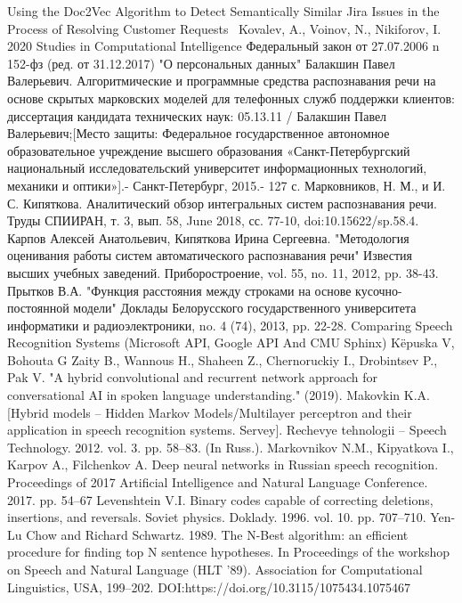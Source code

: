\documentclass[conference]{IEEEtran}
\begin{document}
\begin{thebibliography}{00}
 Using the Doc2Vec Algorithm to Detect Semantically Similar Jira Issues in the Process of Resolving Customer Requests  Kovalev, A., Voinov, N., Nikiforov, I. 2020 Studies in Computational Intelligence
 Федеральный закон от 27.07.2006 n 152-фз (ред. от 31.12.2017) "О персональных данных"
 Балакшин Павел Валерьевич. Алгоритмические и программные средства распознавания речи на основе скрытых марковских моделей для телефонных служб поддержки клиентов: диссертация кандидата технических наук: 05.13.11 / Балакшин Павел Валерьевич;[Место защиты: Федеральное государственное автономное образовательное учреждение высшего образования «Санкт-Петербургский национальный исследовательский университет информационных технологий, механики и оптики»].- Санкт-Петербург, 2015.- 127 с.
 Марковников, Н. М., и И. С. Кипяткова. Аналитический обзор интегральных систем распознавания речи. Труды СПИИРАН, т. 3, вып. 58, June 2018, сс. 77-10, doi:10.15622/sp.58.4.
 Карпов Алексей Анатольевич, Кипяткова Ирина Сергеевна. "Методология оценивания работы систем автоматического распознавания речи" Известия высших учебных заведений. Приборостроение, vol. 55, no. 11, 2012, pp. 38-43.
 Прытков В.А. "Функция расстояния между строками на основе кусочно-постоянной модели" Доклады Белорусского государственного университета информатики и радиоэлектроники, no. 4 (74), 2013, pp. 22-28.
 Comparing Speech Recognition Systems (Microsoft API, Google API And CMU Sphinx) Këpuska V, Bohouta G
 Zaity B., Wannous H., Shaheen Z., Chernoruckiy I., Drobintsev P., Pak V. "A hybrid convolutional and recurrent network approach for conversational AI in spoken language understanding." (2019).
 Makovkin K.A. [Hybrid models – Hidden Markov Models/Multilayer perceptron and their application in speech recognition systems. Servey]. Rechevye tehnologii – Speech Technology. 2012. vol. 3. pp. 58–83. (In Russ.).
 Markovnikov N.M., Kipyatkova I., Karpov A., Filchenkov A. Deep neural networks in Russian speech recognition. Proceedings of 2017 Artificial Intelligence and Natural Language Conference. 2017. pp. 54–67
 Levenshtein V.I. Binary codes capable of correcting deletions, insertions, and reversals. Soviet physics. Doklady. 1996. vol. 10. pp. 707–710.
 Yen-Lu Chow and Richard Schwartz. 1989. The N-Best algorithm: an efficient procedure for finding top N sentence hypotheses. In Proceedings of the workshop on Speech and Natural Language (HLT ’89). Association for Computational Linguistics, USA, 199–202. DOI:https://doi.org/10.3115/1075434.1075467

\end{thebibliography}
\end{document}
